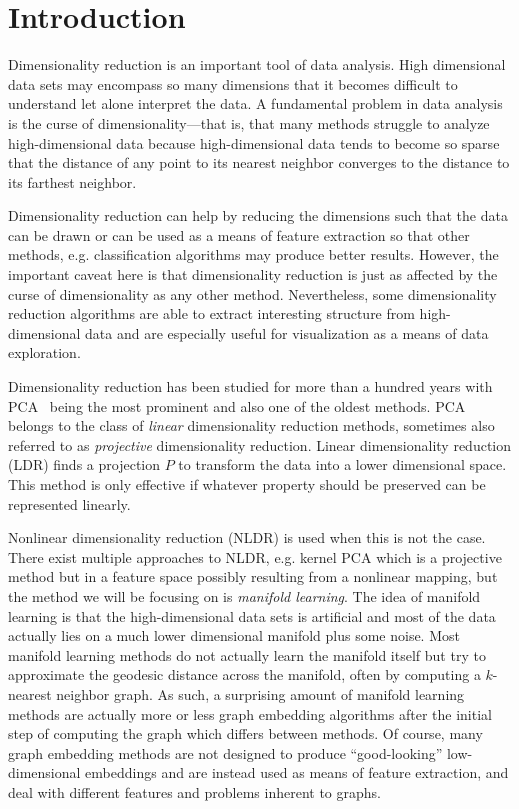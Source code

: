 \chapter{Introduction}\label{ch:intro}

Dimensionality reduction is an important tool of data analysis. High
dimensional data sets may encompass so many dimensions that it becomes
difficult to understand let alone interpret the data. A fundamental problem
in data analysis is the curse of dimensionality---that is, that many methods
struggle to analyze high-dimensional data because high-dimensional data tends
to become so sparse that the distance of any point to its nearest neighbor
converges to the distance to its farthest neighbor.

Dimensionality reduction can help by reducing the dimensions such that the data
can be drawn or can be used as a means of feature extraction so that other
methods, e.g.  classification algorithms may produce better results. However,
the important caveat here is that dimensionality reduction is just as affected
by the curse of dimensionality as any other method. Nevertheless, some
dimensionality reduction algorithms are able to extract interesting structure
from high-dimensional data and are especially useful for visualization as a
means of data exploration.

Dimensionality reduction has been studied for more than a hundred years with PCA~\cite{pearson_pca}
being the most prominent and also one of the oldest methods. PCA belongs to the
class of \emph{linear} dimensionality reduction methods, sometimes also referred
to as \emph{projective} dimensionality reduction. Linear dimensionality reduction (LDR)
finds a projection $P$ to transform the data into a lower dimensional space. This
method is only effective if whatever property should be preserved can be represented
linearly.

Nonlinear dimensionality reduction (NLDR) is used when this is not the case. There
exist multiple approaches to NLDR, e.g. kernel PCA which is a projective method but
in a feature space possibly resulting from a nonlinear mapping, but the method we will
be focusing on is \emph{manifold learning}. The idea of manifold learning is that
the high-dimensional data sets is artificial and most of the data actually lies on
a much lower dimensional manifold plus some noise. Most manifold learning methods
do not actually learn the manifold itself but try to approximate the geodesic distance
across the manifold, often by computing a $k$-nearest neighbor graph. As such, a surprising
amount of manifold learning methods are actually more or less graph embedding algorithms after
the initial step of computing the graph which differs between methods. Of course, many graph
embedding methods are not designed to produce ``good-looking'' low-dimensional embeddings
and are instead used as means of feature extraction, and deal with different features and problems inherent
to graphs.

